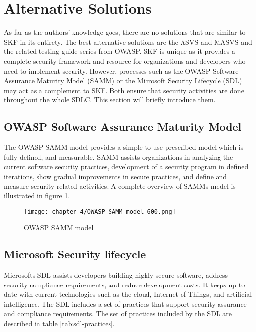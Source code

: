 \section{Alternative Solutions}
As far as the authors' knowledge goes, there are no solutions that are similar to SKF in its entirety. The best alternative solutions are the ASVS and MASVS and the related testing guide series from OWASP. SKF is unique as it provides a complete security framework and resource for organizations and developers who need to implement security. However, processes such as the OWASP Software Assurance Maturity Model (SAMM) or the Microsoft Security Lifecycle (SDL) may act as a complement to SKF. Both ensure that security activities are done throughout the whole SDLC. This section will briefly introduce them.

\subsection{OWASP Software Assurance Maturity Model}
The OWASP SAMM model provides a simple to use prescribed model which is fully defined, and measurable. SAMM assists organizations in analyzing the current software security practices, development of a security program in defined iterations, show gradual improvements in secure practices, and define and measure security-related activities. A complete overview of SAMMs model is illustrated in figure \ref{fig:samm-model}.

\begin{figure}
    \centering
    \caption{OWASP SAMM model}
    \label{fig:samm-model}
    \texttt{[image: chapter-4/OWASP-SAMM-model-600.png]}
\end{figure}

\subsection{Microsoft Security lifecycle}
Microsofts SDL assists developers building highly secure software, address security compliance requirements, and reduce development costs. It keeps up to date with current technologies such as the cloud, Internet of Things, and artificial intelligence. The SDL includes a set of practices that support security assurance and compliance requirements. The set of practices included by the SDL are described in table \ref{tab:sdl-practices}.

